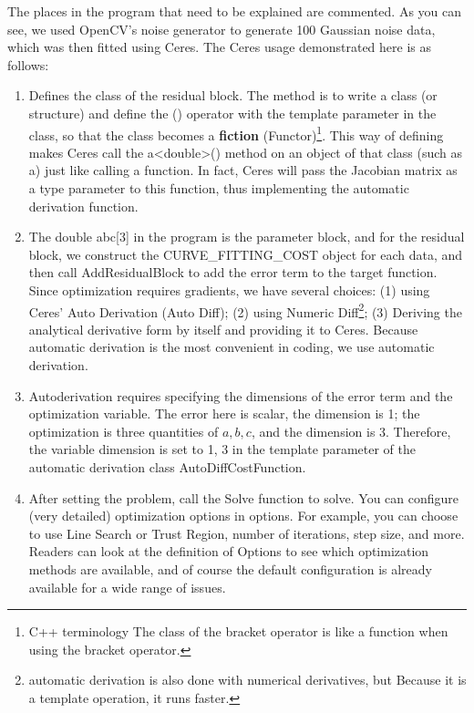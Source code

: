 The places in the program that need to be explained are commented. As you can see, we used OpenCV's noise generator to generate 100 Gaussian noise data, which was then fitted using Ceres. The Ceres usage demonstrated here is as follows:

\begin{enumerate}
	\item Defines the class of the residual block. The method is to write a class (or structure) and define the () operator with the template parameter in the class, so that the class becomes a \textbf{fiction} (Functor)\footnote{C++ terminology The class of the bracket operator is like a function when using the bracket operator. }. This way of defining makes Ceres call the a<double>() method on an object of that class (such as a) just like calling a function. In fact, Ceres will pass the Jacobian matrix as a type parameter to this function, thus implementing the automatic derivation function.
	\item The double abc[3] in the  program is the parameter block, and for the residual block, we construct the CURVE\_FITTING\_COST object for each data, and then call AddResidualBlock to add the error term to the target function. Since optimization requires gradients, we have several choices: (1) using Ceres' Auto Derivation (Auto Diff); (2) using Numeric Diff\footnote{automatic derivation is also done with numerical derivatives, but Because it is a template operation, it runs faster. }; (3) Deriving the analytical derivative form by itself and providing it to Ceres. Because automatic derivation is the most convenient in coding, we use automatic derivation.
	\item Autoderivation requires specifying the dimensions of the error term and the optimization variable. The error here is scalar, the dimension is 1; the optimization is three quantities of $a, b, c$, and the dimension is 3. Therefore, the variable dimension is set to 1, 3 in the template parameter of the automatic derivation class AutoDiffCostFunction.
	\item After setting the problem, call the Solve function to solve. You can configure (very detailed) optimization options in options. For example, you can choose to use Line Search or Trust Region, number of iterations, step size, and more. Readers can look at the definition of Options to see which optimization methods are available, and of course the default configuration is already available for a wide range of issues.
\end{enumerate}
	
